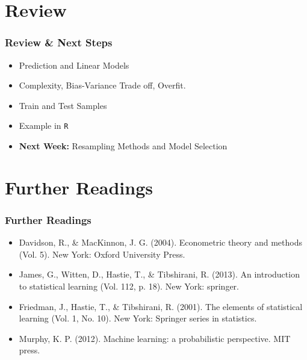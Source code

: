 \documentclass[
  shownotes,
  xcolor={svgnames},
  hyperref={colorlinks,citecolor=DarkBlue,linkcolor=DarkRed,urlcolor=DarkBlue}
  , aspectratio=169]{beamer}
\begin{document}
\section{Review}
\begin{frame}
\frametitle{Review \& Next Steps}
  
  \begin{itemize} 
    \item Prediction and Linear Models
    \medskip
    \item Complexity, Bias-Variance Trade off, Overfit.
    \medskip
    \item Train and Test Samples
    \medskip
    \item Example in \texttt{R}
  \bigskip  

  
  \item  {\bf Next Week:} Resampling Methods and Model Selection
  
  
  \end{itemize}


\end{frame}


\section{Further Readings}
\begin{frame}
\frametitle{Further Readings}

\begin{itemize}
  \item Davidson, R., \& MacKinnon, J. G. (2004). Econometric theory and methods (Vol. 5). New York: Oxford University Press.
  \bigskip
  \item James, G., Witten, D., Hastie, T., \& Tibshirani, R. (2013). An introduction to statistical learning (Vol. 112, p. 18). New York: springer.
  \bigskip
  \item Friedman, J., Hastie, T., \& Tibshirani, R. (2001). The elements of statistical learning (Vol. 1, No. 10). New York: Springer series in statistics.
  \bigskip
  \item Murphy, K. P. (2012). Machine learning: a probabilistic perspective. MIT press.

\end{itemize}

\end{frame}


\end{document}
